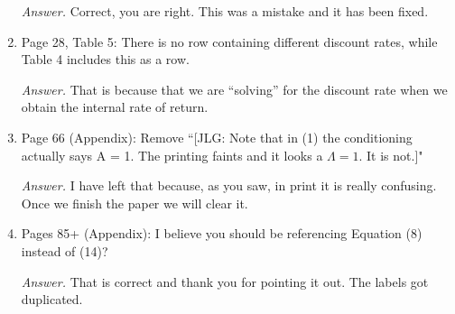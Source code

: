 \begin{enumerate}
\noindent \textit{Answer.} Correct, you are right. This was a mistake and it has been fixed.

\item Page 28, Table 5: There is no row containing different discount rates, while Table 4 includes this as a row.

\noindent \textit{Answer.} That is because that we are ``solving'' for the discount rate when we obtain the internal rate of return. 

\item Page 66 (Appendix): Remove ``[JLG: Note that in (1) the conditioning actually says A = 1. The printing faints and it looks a $\Lambda = 1$. It is not.]"

\noindent \textit{Answer.} I have left that because, as you saw, in print it is really confusing. Once we finish the paper we will clear it.

\item Pages 85+ (Appendix): I believe you should be referencing Equation (8) instead of (14)?

\noindent \textit{Answer.} That is correct and thank you for pointing it out. The labels got duplicated.

\end{enumerate}

\singlespace





